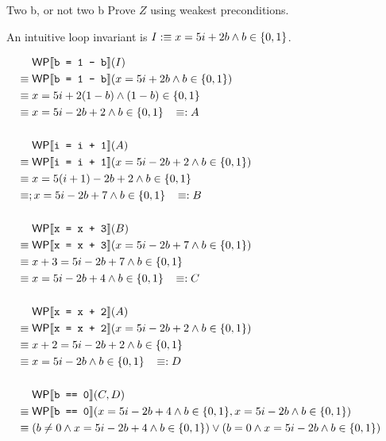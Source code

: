 \documentclass[
  english
]{tumteaching}
\begin{document}
\clearpage
\begin{assignment}[L]{Two b, or not two b}
	Prove $Z$ using weakest preconditions.
	\begin{center}
		\begin{tikzpicture}
		
		\end{tikzpicture}
	\end{center}

	\begin{solution}
		An intuitive loop invariant is $I \defequiv x = 5i + 2b \land b \in \{ 0, 1 \}$.

		\begin{align*}
			&\;\WP{b = 1 - b}(I)\\
			\equiv&\;\WP{b = 1 - b}(x = 5i + 2b \land b \in \{ 0, 1 \})\\
			\equiv&\;x = 5i + 2(1-b) \land (1 - b) \in \{ 0, 1 \}\\
			\equiv&\;x = 5i -2b + 2 \land b \in \{ 0, 1 \} \;\;\; \equivdef A\\
			&&\\
			&\;\WP{i = i + 1}(A)\\
			\equiv&\;\WP{i = i + 1}(x = 5i -2b + 2 \land b \in \{ 0, 1 \})\\
			\equiv&\;x = 5(i+1) - 2b + 2 \land b \in \{ 0, 1 \}\\
			\equiv&;x = 5i - 2b + 7 \land b \in \{ 0, 1 \} \;\;\; \equivdef B\\
			&&\\
			&\;\WP{x = x + 3}(B)\\
			\equiv&\;\WP{x = x + 3}(x = 5i - 2b + 7 \land b \in \{ 0, 1 \})\\
			\equiv&\;x + 3 = 5i - 2b + 7 \land b \in \{ 0, 1 \}\\
			\equiv&\;x = 5i - 2b + 4 \land b \in \{ 0, 1 \} \;\;\; \equivdef C\\
			&&\\
			&\;\WP{x = x + 2}(A)\\
			\equiv&\;\WP{x = x + 2}(x = 5i - 2b + 2 \land b \in \{ 0, 1 \})\\
			\equiv&\;x + 2 = 5i - 2b + 2 \land b \in \{ 0, 1 \}\\
			\equiv&\;x = 5i - 2b \land b \in \{ 0, 1 \} \;\;\; \equivdef D\\
			&&\\
			&\;\WP{b == 0}(C, D)\\
			\equiv&\;\WP{b == 0}(x = 5i - 2b + 4 \land b \in \{ 0, 1\}, x = 5i - 2b \land b \in \{ 0, 1 \})\\
			\equiv&\;(b \neq 0 \land x = 5i - 2b + 4 \land b \in \{ 0, 1 \}) \lor (b = 0 \land x = 5i - 2b \land b \in \{ 0, 1 \})\\

\end{align*}
\end{solution}
\end{assignment}
\end{document}
